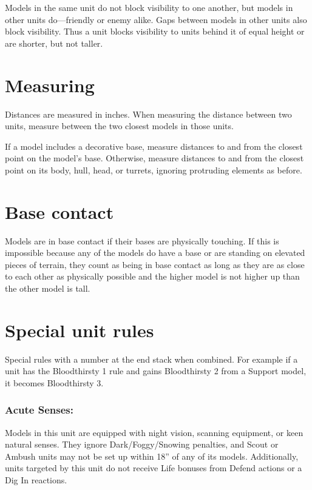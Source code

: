 \begin{multicols}{2}
Models in the same unit do not block visibility to one another, but models in other units do—friendly or enemy alike. Gaps between models in other units also block visibility. Thus a unit blocks visibility to units behind it of equal height or are shorter, but not taller.




\section*{Measuring}

Distances are measured in inches. When measuring the distance between two units, measure between the two closest models in those units.

If a model includes a decorative base, measure distances to and from the closest point on the model's base. Otherwise, measure distances to and from the closest point on its body, hull, head, or turrets, ignoring protruding elements as before.






\section*{Base contact}

Models are in base contact if their bases are physically touching. If this is impossible because any of the models do have a base or are standing on elevated pieces of terrain, they count as being in base contact as long as they are as close to each other as physically possible and the higher model is not higher up than the other model is tall.




\section*{Special unit rules}

Special rules with a number at the end stack when combined. For example if a unit has the Bloodthirsty 1 rule and gains Bloodthirsty 2 from a Support model, it becomes Bloodthirsty 3.

\subsubsection*{Acute Senses:} Models in this unit are equipped with night vision, scanning equipment, or keen natural senses. They ignore Dark/Foggy/Snowing penalties, and Scout or Ambush units may not be set up within 18'' of any of its models. Additionally, units targeted by this unit do not receive Life bonuses from Defend actions or a Dig In reactions.


\end{multicols}
